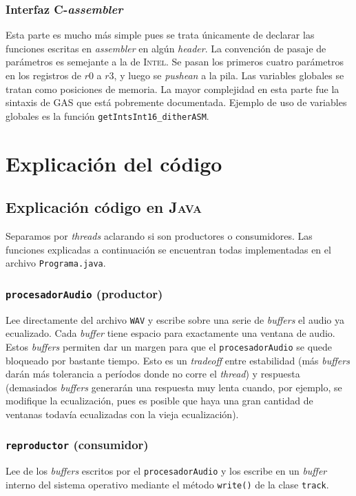\documentclass[%
    compressed,
    titlepage,
    narroweqnarray,
    inline,
    twoside,
    ]{ieee}
\begin{document}
\subsubsection{Interfaz \textsc{C}-\textit{assembler}}
Esta parte es mucho m\'as simple pues se trata \'unicamente de declarar las funciones escritas en \textit{assembler} en alg\'un \textit{header}.
La convenci\'on de pasaje de par\'ametros es semejante a la de \textsc{Intel}. Se pasan los primeros cuatro par\'ametros en los registros
de $r0$ a $r3$, y luego se \textit{pushean} a la pila.
Las variables globales se tratan como posiciones de memoria.
La mayor complejidad en esta parte fue la sintaxis de \textsc{GAS} que est\'a pobremente documentada.
Ejemplo de uso de variables globales es la funci\'on \texttt{getIntsInt16\_ditherASM}.


\section{Explicaci\'on del c\'odigo}
\subsection{Explicaci\'on c\'odigo en \textsc{Java}}
Separamos por \textit{threads} aclarando si son productores o consumidores.
Las funciones explicadas a continuaci\'on se encuentran todas implementadas en el archivo
\texttt{Programa.java}.

\subsubsection{\texttt{procesadorAudio} (productor)}
Lee directamente del archivo \texttt{WAV} y escribe sobre una serie de \textit{buffers} el audio ya ecualizado. Cada \textit{buffer} tiene espacio
para exactamente una ventana de audio.
Estos \textit{buffers} permiten dar un margen para que el \texttt{procesadorAudio} se quede bloqueado por bastante tiempo. Esto es un \textit{tradeoff}
entre estabilidad (m\'as \textit{buffers} dar\'an m\'as tolerancia a per\'iodos donde no corre el \textit{thread}) y respuesta (demasiados \textit{buffers}
generar\'an una respuesta muy lenta cuando, por ejemplo, se modifique la ecualizaci\'on, pues es posible que haya una gran cantidad de ventanas todav\'ia
ecualizadas con la vieja ecualizaci\'on).
\subsubsection{\texttt{reproductor} (consumidor)}
Lee de los \textit{buffers} escritos por el \texttt{procesadorAudio} y los escribe en un \textit{buffer} interno del sistema operativo mediante
el m\'etodo \texttt{write()} de la clase \texttt{track}.
\end{document}
